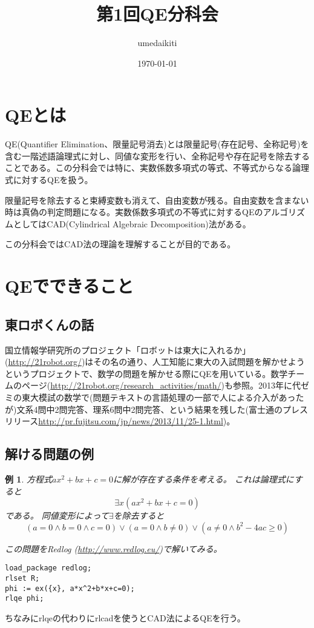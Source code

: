 \documentclass[a4j,12pt]{jarticle}
\title{第1回QE分科会}
\author{umedaikiti}
\date{\today}
\theoremstyle{break}
\newtheorem{Example}{例}[section]
\begin{document}
\maketitle

\section{QEとは}
QE(Quantifier Elimination、限量記号消去)とは限量記号(存在記号、全称記号)を含む一階述語論理式に対し、同値な変形を行い、全称記号や存在記号を除去することである。この分科会では特に、実数係数多項式の等式、不等式からなる論理式に対するQEを扱う。

限量記号を除去すると束縛変数も消えて、自由変数が残る。自由変数を含まない時は真偽の判定問題になる。実数係数多項式の不等式に対するQEのアルゴリズムとしてはCAD(Cylindrical Algebraic Decomposition)法がある。

この分科会ではCAD法の理論を理解することが目的である。

\section{QEでできること}
\subsection{東ロボくんの話}
国立情報学研究所のプロジェクト「ロボットは東大に入れるか」(\url{http://21robot.org/})はその名の通り、人工知能に東大の入試問題を解かせようというプロジェクトで、数学の問題を解かせる際にQEを用いている。数学チームのページ(\url{http://21robot.org/research\_activities/math/})も参照。2013年に代ゼミの東大模試の数学で(問題テキストの言語処理の一部で人による介入があったが)文系4問中2問完答、理系6問中2問完答、という結果を残した(富士通のプレスリリース\url{http://pr.fujitsu.com/jp/news/2013/11/25-1.html})。


\subsection{解ける問題の例}
\begin{Example}
方程式$ax^2 + bx + c = 0$に解が存在する条件を考える。
これは論理式にすると
\[\exists x(ax^2 + bx + c = 0)\]
である。
同値変形によって$\exists$を除去すると
\[(a=0 \wedge b=0 \wedge c=0) \vee (a = 0 \wedge b \ne 0) \vee (a \ne 0 \wedge b^2 - 4ac \ge 0)\]

この問題をRedlog (\url{http://www.redlog.eu/})で解いてみる。
\begin{framed}
\begin{verbatim}
load_package redlog;
rlset R;
phi := ex({x}, a*x^2+b*x+c=0);
rlqe phi;
\end{verbatim}
\end{framed}
\end{Example}
ちなみにrlqeの代わりにrlcadを使うとCAD法によるQEを行う。
\end{document}
